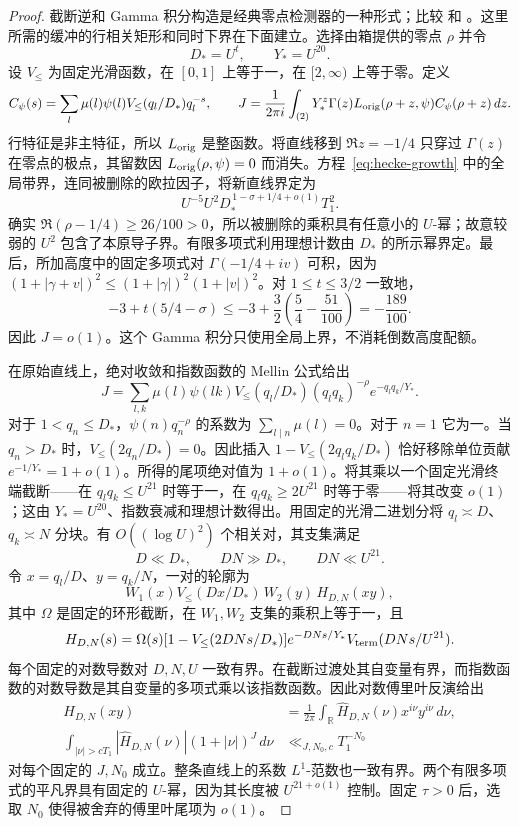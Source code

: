 \documentclass[11pt,a4paper]{article}
\numberwithin{equation}{section}
\numberwithin{figure}{section}
\theoremstyle{definition}
\theoremstyle{remark}
\begin{document}
\begin{proof}
截断逆和 Gamma 积分构造是经典零点检测器的一种形式；比较 \cite[附录 C]{MP} 和 \cite[第~13.1 节]{GM}。这里所需的缓冲的行相关矩形和同时下界在下面建立。选择由箱提供的零点 \(\rho\) 并令
\[
 D_*=U^t,\qquad Y_*=U^{20}.
\]
设 \(V_{\le}\) 为固定光滑函数，在 \([0,1]\) 上等于一，在 \([2,\infty)\) 上等于零。定义
\[
 C_\psi(s)=\sum_l\mu(l)\psi(l)V_{\le}(q_l/D_*)q_l^{-s},
 \qquad
 J=\frac1{2\pi i}\int_{(2)}
       Y_*^z\Gamma(z)L_{\rm orig}(\rho+z,\psi)
       C_\psi(\rho+z)\,dz.
\]
行特征是非主特征，所以 \(L_{\rm orig}\) 是整函数。将直线移到 \(\Re z=-1/4\) 只穿过 \(\Gamma(z)\) 在零点的极点，其留数因 \(L_{\rm orig}(\rho,\psi)=0\) 而消失。方程~\eqref{eq:hecke-growth} 中的全局带界，连同被删除的欧拉因子，将新直线界定为
\[
 U^{-5}U^2D_*^{\,1-\sigma+1/4+o(1)}T_1^2.
\]
确实 \(\Re(\rho-1/4)\ge26/100>0\)，所以被删除的乘积具有任意小的 \(U\)-幂；故意较弱的 \(U^2\) 包含了本原导子界。有限多项式利用理想计数由 \(D_*\) 的所示幂界定。最后，所加高度中的固定多项式对 \(\Gamma(-1/4+iv)\) 可积，因为 \((1+|\gamma+v|)^2\le(1+|\gamma|)^2(1+|v|)^2\)。对 \(1\le t\le3/2\) 一致地，
\[
 -3+t(5/4-\sigma)
 \le-3+\frac32\left(\frac54-\frac{51}{100}\right)
 =-\frac{189}{100}.
\]
因此 \(J=o(1)\)。这个 Gamma 积分只使用全局上界，不消耗倒数高度配额。

在原始直线上，绝对收敛和指数函数的 Mellin 公式给出
\[
 J=\sum_{l,k}\mu(l)\psi(lk)V_{\le}(q_l/D_*)
       (q_lq_k)^{-\rho}e^{-q_lq_k/Y_*}.
\]
对于 \(1<q_n\le D_*\)，\(\psi(n)q_n^{-\rho}\) 的系数为 \(\sum_{l\mid n}\mu(l)=0\)。对于 \(n=1\) 它为一。当 \(q_n>D_*\) 时，\(V_{\le}(2q_n/D_*)=0\)。因此插入 \(1-V_{\le}(2q_lq_k/D_*)\) 恰好移除单位贡献 \(e^{-1/Y_*}=1+o(1)\)。所得的尾项绝对值为 \(1+o(1)\)。将其乘以一个固定光滑终端截断——在 \(q_lq_k\le U^{21}\) 时等于一，在 \(q_lq_k\ge2U^{21}\) 时等于零——将其改变 \(o(1)\)；这由 \(Y_*=U^{20}\)、指数衰减和理想计数得出。用固定的光滑二进划分将 \(q_l\asymp D\)、\(q_k\asymp N\) 分块。有 \(O((\log U)^2)\) 个相关对，其支集满足
\[
 D\ll D_*,\qquad DN\gg D_*,\qquad DN\ll U^{21}.
\]
令 \(x=q_l/D\)、\(y=q_k/N\)，一对的轮廓为
\[
 W_1(x)V_{\le}(Dx/D_*)\,W_2(y)\,H_{D,N}(xy),
\]
其中 \(\Omega\) 是固定的环形截断，在 \(W_1,W_2\) 支集的乘积上等于一，且
\[
 H_{D,N}(s)=\Omega(s)
   [1-V_{\le}(2DNs/D_*)]e^{-DNs/Y_*}
   V_{\rm term}(DNs/U^{21}).
\]
每个固定的对数导数对 \(D,N,U\) 一致有界。在截断过渡处其自变量有界，而指数函数的对数导数是其自变量的多项式乘以该指数函数。因此对数傅里叶反演给出
\[
 \begin{split}
 H_{D,N}(xy)&=\frac1{2\pi}\int_{\mathbb R}
      \widehat H_{D,N}(\nu)x^{i\nu}y^{i\nu}\,d\nu,\\
 \int_{|\nu|>cT_1}|\widehat H_{D,N}(\nu)|
       (1+|\nu|)^J\,d\nu&\ll_{J,N_0,c}T_1^{-N_0}
 \end{split}
\]
对每个固定的 \(J,N_0\) 成立。整条直线上的系数 \(L^1\)-范数也一致有界。两个有限多项式的平凡界具有固定的 \(U\)-幂，因为其长度被 \(U^{21+o(1)}\) 控制。固定 \(\tau>0\) 后，选取 \(N_0\) 使得被舍弃的傅里叶尾项为 \(o(1)\)。


\end{proof}
\end{document}
